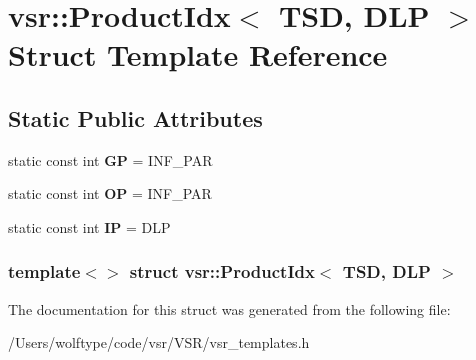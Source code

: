 \hypertarget{structvsr_1_1_product_idx_3_01_t_s_d_00_01_d_l_p_01_4}{\section{vsr\-:\-:Product\-Idx$<$ T\-S\-D, D\-L\-P $>$ Struct Template Reference}
\label{structvsr_1_1_product_idx_3_01_t_s_d_00_01_d_l_p_01_4}
}
\subsection*{Static Public Attributes}
\begin{DoxyCompactItemize}
\item 
\hypertarget{structvsr_1_1_product_idx_3_01_t_s_d_00_01_d_l_p_01_4_a37c5b1118571d276fc83ac9e07c8f79d}{static const int {\bfseries G\-P} = I\-N\-F\-\_\-\-P\-A\-R}\label{structvsr_1_1_product_idx_3_01_t_s_d_00_01_d_l_p_01_4_a37c5b1118571d276fc83ac9e07c8f79d}

\item 
\hypertarget{structvsr_1_1_product_idx_3_01_t_s_d_00_01_d_l_p_01_4_a285084742c0853821e957cd5165abc3a}{static const int {\bfseries O\-P} = I\-N\-F\-\_\-\-P\-A\-R}\label{structvsr_1_1_product_idx_3_01_t_s_d_00_01_d_l_p_01_4_a285084742c0853821e957cd5165abc3a}

\item 
\hypertarget{structvsr_1_1_product_idx_3_01_t_s_d_00_01_d_l_p_01_4_af54b07abde9bbc8bada1d44f0b1235fd}{static const int {\bfseries I\-P} = D\-L\-P}\label{structvsr_1_1_product_idx_3_01_t_s_d_00_01_d_l_p_01_4_af54b07abde9bbc8bada1d44f0b1235fd}

\end{DoxyCompactItemize}
\subsubsection*{template$<$$>$ struct vsr\-::\-Product\-Idx$<$ T\-S\-D, D\-L\-P $>$}



The documentation for this struct was generated from the following file\-:\begin{DoxyCompactItemize}
\item 
/\-Users/wolftype/code/vsr/\-V\-S\-R/vsr\-\_\-templates.\-h\end{DoxyCompactItemize}
